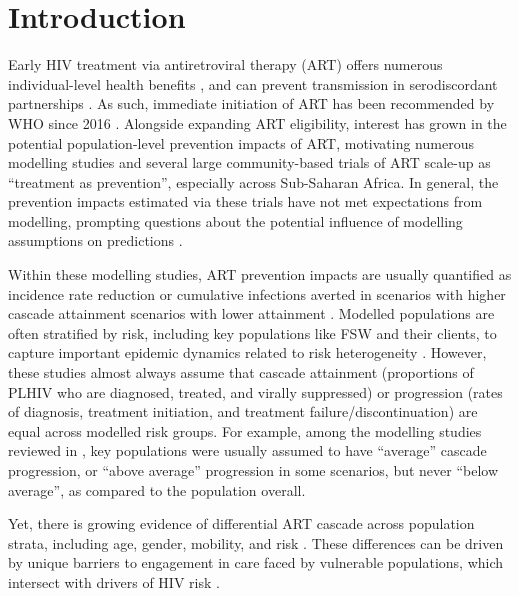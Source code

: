 \section*{Introduction}\label{intro}
Early HIV treatment via antiretroviral therapy (ART) offers
numerous individual-level health benefits \cite{Gabillard2013,Maartens2014,Danel2015,Lundgren2015},
and can prevent transmission in serodiscordant partnerships \cite{Anglemyer2013,Cohen2016,Rodger2019}.
As such, immediate initiation of ART has been recommended by WHO since 2016 \cite{WHO2016art}.
Alongside expanding ART eligibility,
interest has grown in the potential population-level prevention impacts of ART, motivating
numerous modelling studies \cite{Granich2009,Eaton2012,Eaton2014art,Knight2022sr} and
several large community-based trials \cite{Makhema2019,Havlir2019,Hayes2019,Iwuji2018}
of ART scale-up as ``treatment as prevention'', especially across Sub-Saharan Africa.
In general, the prevention impacts estimated via these trials
have not met expectations from modelling, prompting questions about
the potential influence of modelling assumptions on predictions \cite{Baral2019}.
\par
Within these modelling studies, ART prevention impacts are usually quantified as
incidence rate reduction or cumulative infections averted
in scenarios with higher cascade attainment \vs scenarios with lower attainment \cite{Knight2022sr}.
Modelled populations are often stratified by risk,
including key populations like FSW and their clients,
to capture important epidemic dynamics related to risk heterogeneity
\cite{Stigum1994,Garnett1996,Watts2010}.
However, these studies almost always assume that cascade
attainment (\ie proportions of PLHIV who are diagnosed, treated, and virally suppressed) or
progression (\ie rates of diagnosis, treatment initiation, and treatment failure/discontinuation)
are equal across modelled risk groups.
For example, among the modelling studies reviewed in \cite{Knight2022sr},
key populations were usually assumed to have ``average'' cascade progression,
or ``above average'' progression in some scenarios, but never ``below average'',
as compared to the population overall.
\par
Yet, there is growing evidence of differential ART cascade across population strata,
including age, gender, mobility, and risk \cite{Hakim2018,Green2020}.
These differences can be driven by
unique barriers to engagement in care faced by vulnerable populations,
which intersect with drivers of HIV risk \cite{Wanyenze2016,Schwartz2017,Schmidt-Sane2022}.
